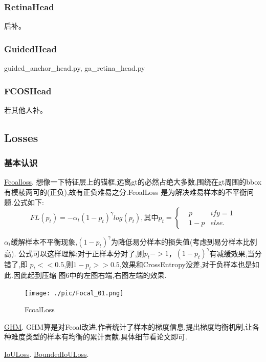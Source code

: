 \documentclass[UTF8]{ctexart}
\begin{document}
\subsubsection{RetinaHead}
后补。
\subsubsection{GuidedHead}
guided\_anchor\_head.py, ga\_retina\_head.py

\subsubsection{FCOSHead}
若其他人补。

\subsection{Losses}
\label{sec:loss}
\subsubsection{基本认识}

\href{https://arxiv.org/abs/1708.02002}{Fcoalloss}.
想像一下特征层上的锚框,远离gt的必然占绝大多数,围绕在gt周围的bbox有模棱两可的(正负),故有正负难易之分.FcoalLoss 是为解决难易样本的不平衡问题.公式如下:
\begin{equation}
	FL(p_t) = -\alpha_{t}(1-p_t)^{\gamma}log(p_t),\text{其中}
	p_t=\left\{
	\begin{aligned}
	&p & if y =1\\
	&1-p & else.
	\end{aligned}
	\right.
\end{equation}

$\alpha_t$缓解样本不平衡现象,$(1-p_t)^{\gamma}$为降低易分样本的损失值(考虑到易分样本比例高).
公式可以这样理解:对于正样本分对了,则$p_t->1$，$(1-p_t)^{\gamma}$有减缓效果,当分错了,即
$p_t << 0.5$,则$1-p_t >>0.5$,效果和CrossEntropy没差,对于负样本也是如此.因此起到压缩
图6中的左图右端,右图左端的效果.

\begin{figure}[htbp]
	\centering
	\texttt{[image: ./pic/Focal\_01.png]}
	\caption{FcoalLoss}
\end{figure}

\href{https://arxiv.org/abs/1811.05181}{GHM}.
GHM算是对Fcoal改进,作者统计了样本的梯度信息,提出梯度均衡机制,让各种难度类型的样本有均衡的累计贡献.具体细节看论文即可.

\href{https://arxiv.org/abs/1908.03851}{IoULoss}.
\href{https://arxiv.org/abs/1711.00164}{BoundedIoULoss}.
\end{document}
